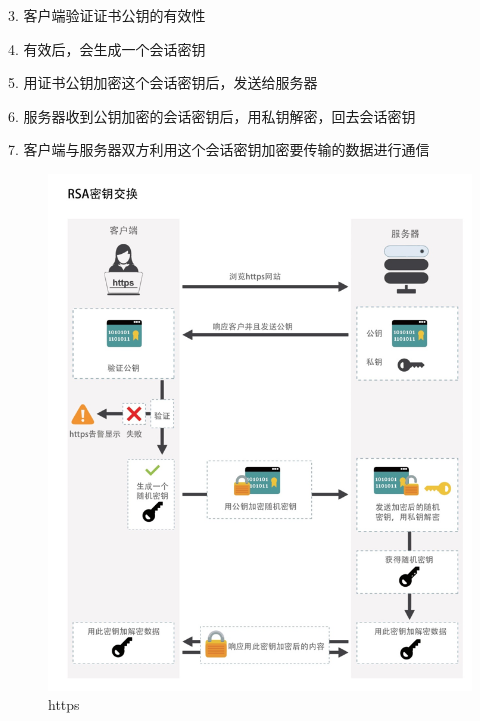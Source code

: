 \documentclass[UTF8]{ctexart}
\begin{document}
3. 客户端验证证书公钥的有效性

4. 有效后，会生成一个会话密钥

5. 用证书公钥加密这个会话密钥后，发送给服务器

6. 服务器收到公钥加密的会话密钥后，用私钥解密，回去会话密钥

7. 客户端与服务器双方利用这个会话密钥加密要传输的数据进行通信

\begin{figure}
	\centering
	\includegraphics[width=0.7\linewidth]{figures/https.png}
	\caption{https}
	\label{fig:https}
\end{figure}
\end{document}
